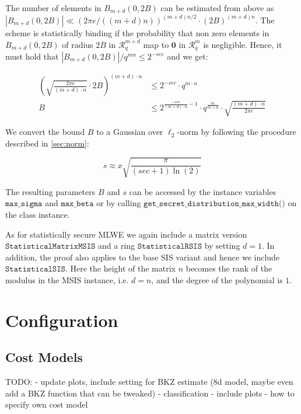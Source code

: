 \documentclass[
  a4paper,  %
  twoside,  %
  bibliography=totoc,
  headsepline,
  cleardoublepage=empty,
  parskip=half,
  draft=false
]{scrbook}
\begin{document}
The number of elements in $B_{m+d}(0, 2B)$ can be estimated from above as $|B_{m+d}(0, 2B)| \ll (2 \pi e /((m+d) n))^{(m+d) n/2} \cdot (2 B)^{(m+d) n}$. The scheme is statistically binding if the probability that non zero elements in $B_{m+d}(0, 2B)$ of radius $2B$ in $\mathcal{R}_q^{m+d}$ map to $\mathbf{0}$ in $\mathcal{R}_q^{m}$ is negligible. Hence, it must hold that $|B_{m+d}(0, 2B)|/q^{m n} \leq 2^{-sec}$ and we get:


\begin{align}
  \left(\sqrt{\frac{2 \pi e}{(m+d) \cdot n}} \cdot 2 B\right)^{(m+d) \cdot n} & \leq 2^{-sec} \cdot q^{m\cdot n}                                                                       \\
  B                                                                           & \leq 2^{\frac{-sec}{(m+d)\cdot n} - 1} \cdot q^\frac{m}{m+d} \cdot \sqrt{\frac{(m+d)\cdot n}{2 \pi e}}
\end{align}

We convert the bound $B$ to a Gaussian over $\ell_2$-norm by following the procedure described in \cref{sec:norm}: %

\begin{equation}
  s  \approx x \sqrt{\frac{\pi}{(sec + 1) \ln(2)}}
\end{equation}

The resulting parameters $B$ and $s$ can be accessed by the instance variables $\texttt{max\_sigma}$ and $\texttt{max\_beta}$ or by calling $\texttt{get\_secret\_distribution\_max\_width()}$ on the class instance.

As for statistically secure MLWE we again include a matrix version $\texttt{StatisticalMatrixMSIS}$ and a ring $\texttt{StatisticalRSIS}$ by setting $d=1$. In addition, the proof also applies to the base SIS variant and hence we include $\texttt{StatisticalSIS}$. Here the height of the matrix $n$ becomes the rank of the modulus in the MSIS instance, i.e. $d=n$, and the degree of the polynomial is $1$.





\section{Configuration}
\subsection{Cost Models}
TODO:
- update plots, include setting for BKZ estimate (8d model, maybe even add a BKZ function that can be tweaked)
- classification
- include plots
- how to specify own cost model
\end{document}
